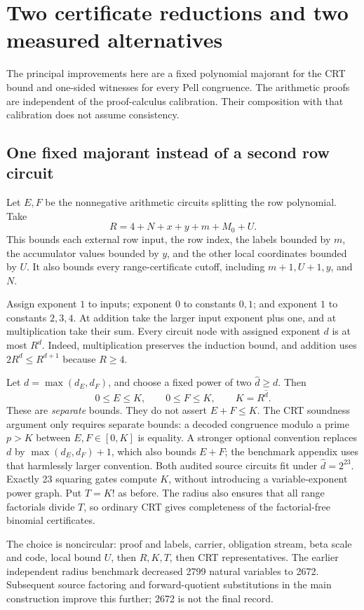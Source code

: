 \section{Two certificate reductions and two measured alternatives}
\label{sec:architecture}

The principal improvements here are a fixed polynomial majorant for the
CRT bound and one-sided witnesses for every Pell congruence. The arithmetic
proofs are independent of the proof-calculus calibration. Their composition
with that calibration does not assume consistency.

\subsection{One fixed majorant instead of a second row circuit}

Let $E,F$ be the nonnegative arithmetic circuits splitting the row
polynomial. Take
\[
 R=4+N+x+y+m+M_0+U.
\]
This bounds each external row input, the row index, the labels bounded by
$m$, the accumulator values bounded by $y$, and the other local coordinates
bounded by $U$. It also bounds every range-certificate cutoff, including
$m+1,U+1,y$, and $N$.

Assign exponent $1$ to inputs; exponent $0$ to constants $0,1$; and exponent
$1$ to constants $2,3,4$. At addition take the larger input exponent plus
one, and at multiplication take their sum. Every circuit node with assigned
exponent $d$ is at most $R^d$. Indeed, multiplication preserves the
induction bound, and addition uses $2R^d\le R^{d+1}$ because $R\ge4$.

Let $d=\max(d_E,d_F)$, and choose a fixed power of two $\widehat d\ge d$.
Then
\[
 0\le E\le K,\qquad0\le F\le K,\qquad K=R^{\widehat d}.
\]
These are \emph{separate} bounds. They do not assert $E+F\le K$.
The CRT soundness argument only requires separate bounds: a decoded
congruence modulo a prime $p>K$ between $E,F\in[0,K]$ is equality.
A stronger optional convention replaces $d$ by $\max(d_E,d_F)+1$,
which also bounds $E+F$; the benchmark appendix uses that harmlessly
larger convention. Both audited source circuits fit under
$\widehat d=2^{23}$. Exactly 23 squaring gates compute $K$, without
introducing a variable-exponent power graph. Put $T=K!$ as before.
The radius also ensures that all range factorials divide $T$, so ordinary
CRT gives completeness of the factorial-free binomial certificates.

The choice is noncircular: proof and labels, carrier, obligation stream,
beta scale and code, local bound $U$, then $R,K,T$, then CRT representatives.
The earlier independent radius benchmark decreased 2799 natural variables
to 2672. Subsequent source factoring and forward-quotient substitutions in
the main construction improve this further; 2672 is not the final record.

